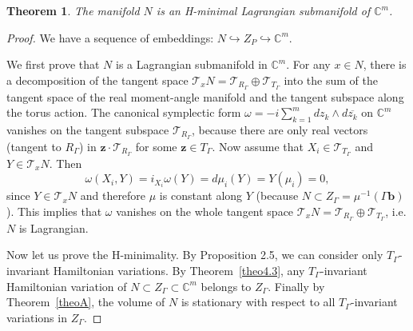 \documentclass[jsg]{IP_v1_forauthors}
\newtheorem{theo}{Theorem}[section]
\theoremstyle{definition}
\numberwithin{equation}{section}
\begin{document}
\begin{theo}\label{theoB}
The manifold $N$ is an H-minimal Lagrangian submanifold of ${\mathbb C}^m $.
\end{theo}
\begin{proof}
We have a sequence of embeddings: $N \hookrightarrow Z_P \hookrightarrow {\mathbb C}^m$.

We first prove that $N$ is a Lagrangian submanifold in ${\mathbb C}^m$. For any $x \in N$, there is a decomposition of the tangent space $\mathcal T_x N=\mathcal T_{R_\Gamma} \oplus \mathcal T_{T_\Gamma}$ into the sum of the tangent space of the real moment-angle manifold and the tangent subspace along the torus action. The canonical symplectic form $\omega= - i \sum_{k=1}^m dz_k \wedge d\overline{z_k}$ on ${\mathbb C}^m $ vanishes on the tangent subspace $\mathcal T_{R_\Gamma}$, because there are only real vectors (tangent to $R_\Gamma$) in $\boldsymbol{z} \cdot \mathcal T_{R_\Gamma}$ for some $\boldsymbol{z} \in T_\Gamma$. Now assume that $X_i \in \mathcal T_{T_\Gamma}$ and $Y \in  \mathcal T_x N$. Then
\begin{equation} 
\omega(X_i,Y)=i_{X_i} \omega (Y)=d \mu_i (Y)= Y(\mu_i) =0, 
\end{equation}
since $Y \in  \mathcal T_x N$ and therefore $\mu$ is constant along $Y$ (because $N\subset Z_\Gamma= \mu^{-1} (\Gamma \boldsymbol{b})$). This implies that $\omega$ vanishes on the whole tangent space $\mathcal T_x N=\mathcal T_{R_\Gamma} \oplus \mathcal T_{T_\Gamma}$, i.e. $N$ is Lagrangian.

Now let us prove the H-minimality. By Proposition 2.5, we can consider only $T_\Gamma$-invariant Hamiltonian variations. By Theorem~\ref{theo4.3}, any $T_\Gamma$-invariant Hamiltonian variation of $N\subset Z_\Gamma\subset {\mathbb C}^m$ belongs to $Z_\Gamma$. Finally by Theorem~\ref{theoA}, the volume of $N$ is stationary with respect to all $T_\Gamma$-invariant variations in $Z_\Gamma$.
\end{proof}
\end{document}
